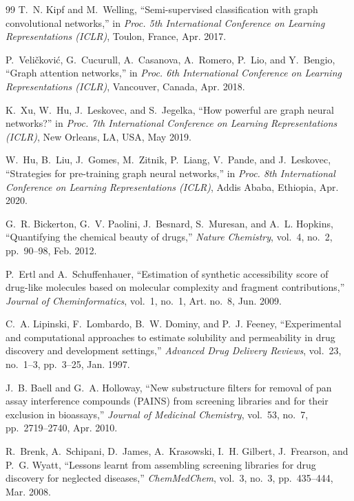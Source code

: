 \documentclass[12pt,a4paper]{report}
\begin{document}
\begin{thebibliography}{99}
T.~N. Kipf and M.~Welling,
``Semi-supervised classification with graph convolutional networks,''
in \textit{Proc. 5th International Conference on Learning Representations (ICLR)},
Toulon, France, Apr. 2017.

P.~Veli\v{c}kovi\'{c}, G.~Cucurull, A.~Casanova, A.~Romero, P.~Lio, and Y.~Bengio,
``Graph attention networks,''
in \textit{Proc. 6th International Conference on Learning Representations (ICLR)},
Vancouver, Canada, Apr. 2018.

K.~Xu, W.~Hu, J.~Leskovec, and S.~Jegelka,
``How powerful are graph neural networks?''
in \textit{Proc. 7th International Conference on Learning Representations (ICLR)},
New Orleans, LA, USA, May 2019.

W.~Hu, B.~Liu, J.~Gomes, M.~Zitnik, P.~Liang, V.~Pande, and J.~Leskovec,
``Strategies for pre-training graph neural networks,''
in \textit{Proc. 8th International Conference on Learning Representations (ICLR)},
Addis Ababa, Ethiopia, Apr. 2020.


G.~R. Bickerton, G.~V. Paolini, J.~Besnard, S.~Muresan, and A.~L. Hopkins,
``Quantifying the chemical beauty of drugs,''
\textit{Nature Chemistry}, vol.~4, no.~2, pp.~90--98, Feb. 2012.

P.~Ertl and A.~Schuffenhauer,
``Estimation of synthetic accessibility score of drug-like molecules based on molecular complexity and fragment contributions,''
\textit{Journal of Cheminformatics}, vol.~1, no.~1, Art. no.~8, Jun. 2009.

C.~A. Lipinski, F.~Lombardo, B.~W. Dominy, and P.~J. Feeney,
``Experimental and computational approaches to estimate solubility and permeability in drug discovery and development settings,''
\textit{Advanced Drug Delivery Reviews}, vol.~23, no.~1--3, pp.~3--25, Jan. 1997.

J.~B. Baell and G.~A. Holloway,
``New substructure filters for removal of pan assay interference compounds (PAINS) from screening libraries and for their exclusion in bioassays,''
\textit{Journal of Medicinal Chemistry}, vol.~53, no.~7, pp.~2719--2740, Apr. 2010.

R.~Brenk, A.~Schipani, D.~James, A.~Krasowski, I.~H. Gilbert, J.~Frearson, and P.~G. Wyatt,
``Lessons learnt from assembling screening libraries for drug discovery for neglected diseases,''
\textit{ChemMedChem}, vol.~3, no.~3, pp.~435--444, Mar. 2008.


\end{thebibliography}
\end{document}
